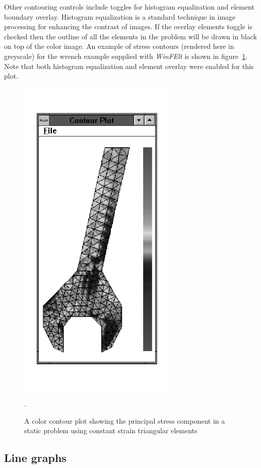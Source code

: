 Other contouring controls include toggles for histogram equalization and
element boundary overlay.  Histogram equalization is a standard technique
in image processing for enhancing the contrast of images.  If the overlay
elements toggle is checked then the outline of all the elements in the problem
will be drawn in black on top of the color image.  An example of stress
contours (rendered here in greyscale) for the wrench example supplied with
{\em WinFElt} is shown in figure~\ref{winfelt.contour}.  Note that both histogram
equalization and element overlay were enabled for this plot.
\begin{figure}
\begin{center}
 \includegraphics[width=3in]{figures/winfelt_contour}
\end{center}
\caption{A color contour plot showing the principal stress component in
         a static problem using constant strain triangular elements}.
\label{winfelt.contour}
\end{figure}

\subsection{Line graphs}

